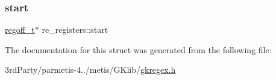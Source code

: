 \mbox{\label{structre__registers_a6676ddb6ab07e50191e149b04dbcfe03}} 
\subsubsection{\texorpdfstring{start}{start}}
{\footnotesize\ttfamily \hyperlink{gkregex_8h_a5b34995b47432512ee4ffa32b836e65f}{regoff\+\_\+t}$\ast$ re\+\_\+registers\+::start}



The documentation for this struct was generated from the following file\+:\begin{DoxyCompactItemize}
\item 
3rd\+Party/parmetis-\/4../metis/\+G\+Klib/\hyperlink{gkregex_8h}{gkregex.\+h}\end{DoxyCompactItemize}
